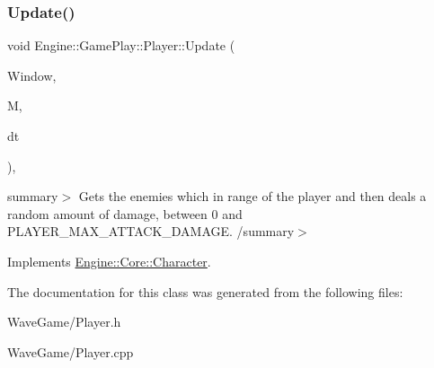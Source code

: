 \subsubsection{\texorpdfstring{Update()}{Update()}}
{\footnotesize\ttfamily void Engine\+::\+Game\+Play\+::\+Player\+::\+Update (\begin{DoxyParamCaption}\item[{Render\+Window $\ast$}]{Window,  }\item[{\hyperlink{class_engine_1_1_core_1_1_map}{Map}}]{M,  }\item[{float}]{dt }\end{DoxyParamCaption})\hspace{0.3cm}{\ttfamily [override]}, {\ttfamily [virtual]}}

summary$>$ Gets the enemies which in range of the player and then deals a random amount of damage, between 0 and P\+L\+A\+Y\+E\+R\+\_\+\+M\+A\+X\+\_\+\+A\+T\+T\+A\+C\+K\+\_\+\+D\+A\+M\+A\+GE. /summary$>$ 

Implements \hyperlink{class_engine_1_1_core_1_1_character}{Engine\+::\+Core\+::\+Character}.



The documentation for this class was generated from the following files\+:\begin{DoxyCompactItemize}
\item 
Wave\+Game/Player.\+h\item 
Wave\+Game/Player.\+cpp\end{DoxyCompactItemize}
